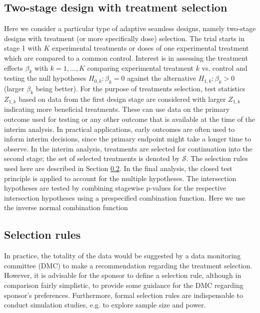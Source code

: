 \documentclass[bimj,fleqn]{w-art}
\theoremstyle{plain}
\theoremstyle{definition}
\begin{document}
\subsection{Two-stage design with treatment selection}
\label{ssec:two_stage_design_with_treatment_selection}
Here we consider a particular type of adaptive seamless designs, namely two-stage designs with treatment (or more specifically dose) selection. The trial starts in stage 1 with $K$ experimental treatments or doses of one experimental treatment which are compared to a common control. Interest is in assessing the treatment effects $\beta_k$ with $k=1,\dots, K$ comparing experimental treatment $k$ vs. control and testing the null hypotheses $H_{0,k}: \beta_k=0$ against the alternative  $H_{1,k}: \beta_k>0$ (larger $\beta_k$ being better). For the purpose of treatments selection, test statistics $Z_{1,k}$ based on data from the first design stage are considered with larger $Z_{1,k}$ indicating more beneficial treatments. These can use data on the primary outcome used for testing or any other outcome that is available at the time of the interim analysis. In practical applications, early outcomes are often used to inform interim decisions, since the primary endpoint might take a longer time to observe. In the interim analysis, treatments are selected for continuation into the second stage; the set of selected treatments is denoted by $\mathcal{S}$. The selection rules used here are described in Section \ref{ssec:selection_rules}. In the final analysis, the closed test principle is applied to account for the multiple hypotheses. The intersection hypotheses are tested by combining stagewise p-values for the respective intersection hypotheses using a prespecified combination function. Here we use the inverse normal combination function~\citep{lehmacher_adaptive_1999}

\subsection{Selection rules}
\label{ssec:selection_rules}
In practice, the totality of the data would be suggested by a data monitoring committee (DMC) to make a recommendation regarding the treatment selection. However, it is advisable for the sponsor to define a selection rule, although in comparison fairly simplistic, to provide some guidance for the DMC regarding sponsor's preferences. Furthermore, formal selection rules are indispensable to conduct simulation studies, e.g. to explore sample size and power. 
\end{document}
